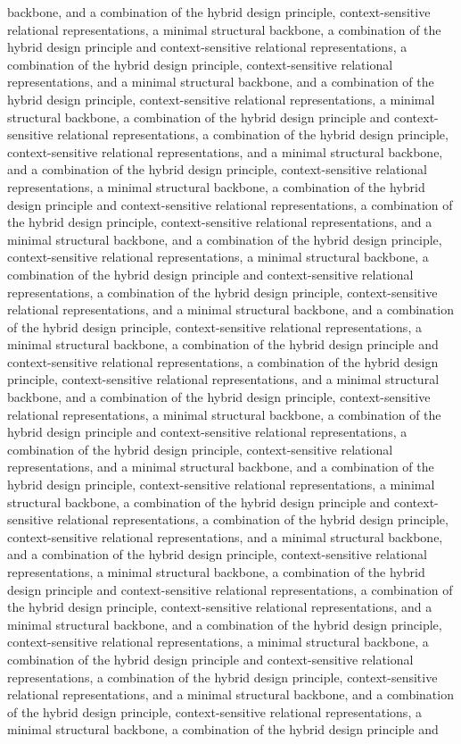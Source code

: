 backbone, and a combination of the hybrid design principle, context-sensitive relational representations, a minimal structural backbone, a combination of the hybrid design principle and context-sensitive relational representations, a combination of the hybrid design principle, context-sensitive relational representations, and a minimal structural backbone, and a combination of the hybrid design principle, context-sensitive relational representations, a minimal structural backbone, a combination of the hybrid design principle and context-sensitive relational representations, a combination of the hybrid design principle, context-sensitive relational representations, and a minimal structural backbone, and a combination of the hybrid design principle, context-sensitive relational representations, a minimal structural backbone, a combination of the hybrid design principle and context-sensitive relational representations, a combination of the hybrid design principle, context-sensitive relational representations, and a minimal structural backbone, and a combination of the hybrid design principle, context-sensitive relational representations, a minimal structural backbone, a combination of the hybrid design principle and context-sensitive relational representations, a combination of the hybrid design principle, context-sensitive relational representations, and a minimal structural backbone, and a combination of the hybrid design principle, context-sensitive relational representations, a minimal structural backbone, a combination of the hybrid design principle and context-sensitive relational representations, a combination of the hybrid design principle, context-sensitive relational representations, and a minimal structural backbone, and a combination of the hybrid design principle, context-sensitive relational representations, a minimal structural backbone, a combination of the hybrid design principle and context-sensitive relational representations, a combination of the hybrid design principle, context-sensitive relational representations, and a minimal structural backbone, and a combination of the hybrid design principle, context-sensitive relational representations, a minimal structural backbone, a combination of the hybrid design principle and context-sensitive relational representations, a combination of the hybrid design principle, context-sensitive relational representations, and a minimal structural backbone, and a combination of the hybrid design principle, context-sensitive relational representations, a minimal structural backbone, a combination of the hybrid design principle and context-sensitive relational representations, a combination of the hybrid design principle, context-sensitive relational representations, and a minimal structural backbone, and a combination of the hybrid design principle, context-sensitive relational representations, a minimal structural backbone, a combination of the hybrid design principle and context-sensitive relational representations, a combination of the hybrid design principle, context-sensitive relational representations, and a minimal structural backbone, and a combination of the hybrid design principle, context-sensitive relational representations, a minimal structural backbone, a combination of the hybrid design principle and 